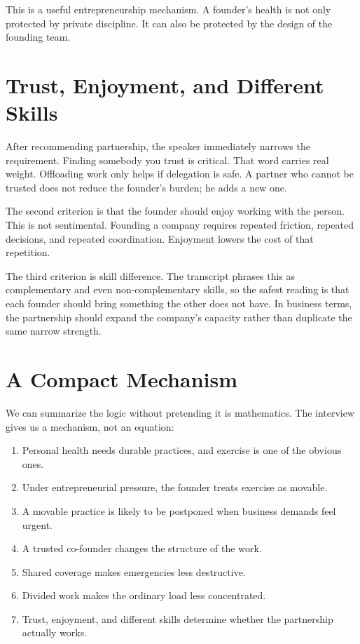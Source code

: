 This is a useful entrepreneurship mechanism. A founder's health is not only protected by private discipline. It can also be protected by the design of the founding team.

\section{Trust, Enjoyment, and Different Skills}

After recommending partnership, the speaker immediately narrows the requirement. Finding somebody you trust is critical. That word carries real weight. Offloading work only helps if delegation is safe. A partner who cannot be trusted does not reduce the founder's burden; he adds a new one.

The second criterion is that the founder should enjoy working with the person. This is not sentimental. Founding a company requires repeated friction, repeated decisions, and repeated coordination. Enjoyment lowers the cost of that repetition.

The third criterion is skill difference. The transcript phrases this as complementary and even non-complementary skills, so the safest reading is that each founder should bring something the other does not have. In business terms, the partnership should expand the company's capacity rather than duplicate the same narrow strength.

\section{A Compact Mechanism}

We can summarize the logic without pretending it is mathematics. The interview gives us a mechanism, not an equation:

\begin{enumerate}
\item Personal health needs durable practices, and exercise is one of the obvious ones.
\item Under entrepreneurial pressure, the founder treats exercise as movable.
\item A movable practice is likely to be postponed when business demands feel urgent.
\item A trusted co-founder changes the structure of the work.
\item Shared coverage makes emergencies less destructive.
\item Divided work makes the ordinary load less concentrated.
\item Trust, enjoyment, and different skills determine whether the partnership actually works.
\end{enumerate}

